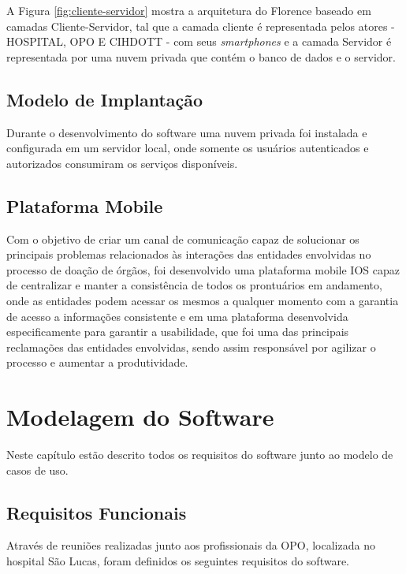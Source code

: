 \documentclass[portuguese,oneside]{tcc}
\begin{document}
A Figura \ref{fig:cliente-servidor} mostra a arquitetura do Florence baseado em camadas Cliente-Servidor, tal que a camada cliente é representada pelos atores - HOSPITAL, OPO E CIHDOTT - com seus \textit{smartphones} e a camada Servidor é representada por uma nuvem privada que contém o banco de dados e o servidor.


\section{Modelo de Implantação}
Durante o desenvolvimento do software uma nuvem privada foi instalada e configurada em um servidor local, onde somente os usuários autenticados e autorizados consumiram os serviços disponíveis.

\section{Plataforma Mobile}
Com o objetivo de criar um canal de comunicação capaz de solucionar os principais problemas relacionados às interações das entidades envolvidas no processo de doação de órgãos, foi desenvolvido uma plataforma mobile IOS capaz de centralizar e manter a consistência de todos os prontuários em andamento, onde as entidades podem acessar os mesmos a qualquer momento com a garantia de acesso a informações consistente e em uma plataforma desenvolvida especificamente para garantir a usabilidade, que foi uma das principais reclamações das entidades envolvidas, sendo assim responsável por agilizar o processo e aumentar a produtividade.

\chapter{Modelagem do Software}
Neste capítulo estão descrito todos os requisitos do software junto ao modelo de casos de uso.

\section{Requisitos Funcionais}
Através de reuniões realizadas junto aos profissionais da OPO, localizada no hospital São Lucas, foram definidos os seguintes requisitos do software.
\end{document}
